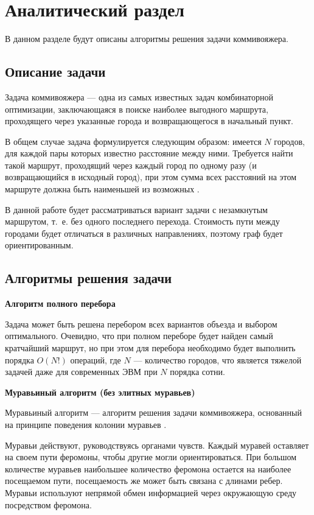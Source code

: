 \chapter{Аналитический раздел}

В данном разделе будут описаны алгоритмы решения задачи коммивояжера.

\section{Описание задачи}

Задача коммивояжера --- одна из самых известных задач комбинаторной оптимизации, заключающаяся в поиске наиболее выгодного маршрута, проходящего через указанные города и возвращающегося в начальный пункт.

В общем случае задача формулируется следующим образом: имеется $N$ городов, для каждой пары которых известно расстояние между ними. Требуется найти такой маршрут, проходящий через каждый город по одному разу (и возвращающийся в исходный город), при этом сумма всех расстояний на этом маршруте должна быть наименьшей из возможных \cite{intro}.

В данной работе будет рассматриваться вариант задачи с незамкнутым маршрутом, т.~е. без одного последнего перехода.
Стоимость пути между городами будет отличаться в различных направлениях, поэтому граф будет ориентированным.

\section{Алгоритмы решения задачи}

\textbf{Алгоритм полного перебора}

Задача может быть решена перебором всех вариантов объезда и выбором оптимального.
Очевидно, что при полном переборе будет найден самый кратчайший маршрут, но при этом для перебора необходимо будет выполнить порядка $O(N!)$ операций, где $N$ --- количество городов, что является тяжелой задачей даже для современных ЭВМ при $N$ порядка сотни.

\textbf{Муравьиный алгоритм (без элитных муравьев)}

Муравьиный алгоритм --- алгоритм решения задачи коммивояжера, основанный на принципе поведения колонии
муравьев \cite{ants}. 

Муравьи действуют, руководствуясь органами чувств. Каждый муравей оставляет на своем пути феромоны, чтобы другие могли ориентироваться. При большом количестве муравьев наибольшее количество феромона остается на наиболее посещаемом пути, посещаемость же может быть связана с длинами ребер. Муравьи используют непрямой обмен информацией через окружающую среду посредством феромона.

